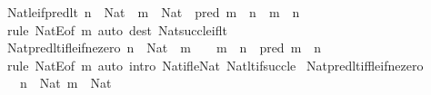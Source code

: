 \begin{isabellebody}
\ Nat{\isacharunderscore}{\kern0pt}le{\isacharunderscore}{\kern0pt}if{\isacharunderscore}{\kern0pt}pred{\isacharunderscore}{\kern0pt}lt{\isacharcolon}{\kern0pt}\ {\isachardoublequoteopen}n\ {\isacharcolon}{\kern0pt}\ Nat\ {\isasymLongrightarrow}\ m\ {\isacharcolon}{\kern0pt}\ Nat\ {\isasymLongrightarrow}\ pred\ m\ {\isacharless}{\kern0pt}\ n\ {\isasymLongrightarrow}\ m\ {\isasymle}\ n{\isachardoublequoteclose}\isanewline
%
\isadelimproof
\ \ %
\endisadelimproof
%
\isatagproof
{}\isamarkupfalse%
\ {\isacharparenleft}{\kern0pt}rule\ NatE{\isacharbrackleft}{\kern0pt}of\ m{\isacharbrackright}{\kern0pt}{\isacharparenright}{\kern0pt}\ {\isacharparenleft}{\kern0pt}auto\ dest{\isacharcolon}{\kern0pt}\ Nat{\isacharunderscore}{\kern0pt}succ{\isacharunderscore}{\kern0pt}le{\isacharunderscore}{\kern0pt}if{\isacharunderscore}{\kern0pt}lt{\isacharparenright}{\kern0pt}%
\endisatagproof
{\isafoldproof}%
%
\isadelimproof
\isanewline
%
\endisadelimproof
\isanewline
{}\isamarkupfalse%
\ Nat{\isacharunderscore}{\kern0pt}pred{\isacharunderscore}{\kern0pt}lt{\isacharunderscore}{\kern0pt}if{\isacharunderscore}{\kern0pt}le{\isacharunderscore}{\kern0pt}if{\isacharunderscore}{\kern0pt}ne{\isacharunderscore}{\kern0pt}zero{\isacharcolon}{\kern0pt}\ {\isachardoublequoteopen}n\ {\isacharcolon}{\kern0pt}\ Nat\ {\isasymLongrightarrow}\ m\ {\isasymnoteq}\ {}\ {\isasymLongrightarrow}\ m\ {\isasymle}\ n\ {\isasymLongrightarrow}\ pred\ m\ {\isacharless}{\kern0pt}\ n{\isachardoublequoteclose}\isanewline
%
\isadelimproof
\ \ %
\endisadelimproof
%
\isatagproof
{}\isamarkupfalse%
\ {\isacharparenleft}{\kern0pt}rule\ NatE{\isacharbrackleft}{\kern0pt}of\ m{\isacharbrackright}{\kern0pt}{\isacharparenright}{\kern0pt}\ {\isacharparenleft}{\kern0pt}auto\ intro{\isacharcolon}{\kern0pt}\ Nat{\isacharunderscore}{\kern0pt}if{\isacharunderscore}{\kern0pt}le{\isacharunderscore}{\kern0pt}Nat\ Nat{\isacharunderscore}{\kern0pt}lt{\isacharunderscore}{\kern0pt}if{\isacharunderscore}{\kern0pt}succ{\isacharunderscore}{\kern0pt}le{\isacharparenright}{\kern0pt}%
\endisatagproof
{\isafoldproof}%
%
\isadelimproof
\isanewline
%
\endisadelimproof
\isanewline
{}\isamarkupfalse%
\ Nat{\isacharunderscore}{\kern0pt}pred{\isacharunderscore}{\kern0pt}lt{\isacharunderscore}{\kern0pt}iff{\isacharunderscore}{\kern0pt}le{\isacharunderscore}{\kern0pt}if{\isacharunderscore}{\kern0pt}ne{\isacharunderscore}{\kern0pt}zero{\isacharcolon}{\kern0pt}\isanewline
\ \ \ {\isachardoublequoteopen}n\ {\isacharcolon}{\kern0pt}\ Nat{\isachardoublequoteclose}\ {\isachardoublequoteopen}m\ {\isacharcolon}{\kern0pt}\ Nat{\isachardoublequoteclose}\isanewline

\end{isabellebody}
